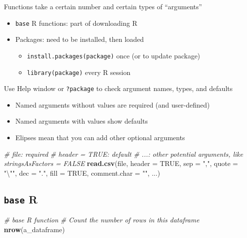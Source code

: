 \documentclass[
  openany]{book}
\newenvironment{Shaded}{\begin{snugshade}}{\end{snugshade}}
\newcommand{\CharTok}[1]{\textcolor[rgb]{0.31,0.60,0.02}{#1}}
\newcommand{\CommentTok}[1]{\textcolor[rgb]{0.56,0.35,0.01}{\textit{#1}}}
\newcommand{\DataTypeTok}[1]{\textcolor[rgb]{0.13,0.29,0.53}{#1}}
\newcommand{\KeywordTok}[1]{\textcolor[rgb]{0.13,0.29,0.53}{\textbf{#1}}}
\newcommand{\NormalTok}[1]{#1}
\newcommand{\OtherTok}[1]{\textcolor[rgb]{0.56,0.35,0.01}{#1}}
\newcommand{\StringTok}[1]{\textcolor[rgb]{0.31,0.60,0.02}{#1}}
\providecommand{\tightlist}{%
  \setlength{\itemsep}{0pt}\setlength{\parskip}{0pt}}
\begin{document}
Functions take a certain number and certain types of ``arguments''

\begin{itemize}
\tightlist
\item
  \texttt{base} R functions: part of downloading R
\item
  Packages: need to be installed, then loaded

  \begin{itemize}
  \tightlist
  \item
    \texttt{install.packages(package)} once (or to update package)
  \item
    \texttt{library(package)} every R session
  \end{itemize}
\end{itemize}

Use Help window or \texttt{?package} to check argument names, types, and defaults

\begin{itemize}
\tightlist
\item
  Named arguments without values are required (and user-defined)
\item
  Named arguments with values show defaults
\item
  Elipses mean that you can add other optional arguments
\end{itemize}

\begin{Shaded}
\begin{Highlighting}[]
\CommentTok{# file: required}
\CommentTok{# header = TRUE: default}
\CommentTok{# ...: other potential arguments, like stringsAsFactors = FALSE}
\KeywordTok{read.csv}\NormalTok{(file, }\DataTypeTok{header =} \OtherTok{TRUE}\NormalTok{, }\DataTypeTok{sep =} \StringTok{","}\NormalTok{, }\DataTypeTok{quote =} \StringTok{"}\CharTok{\textbackslash{}"}\StringTok{"}\NormalTok{,}
         \DataTypeTok{dec =} \StringTok{"."}\NormalTok{, }\DataTypeTok{fill =} \OtherTok{TRUE}\NormalTok{, }\DataTypeTok{comment.char =} \StringTok{""}\NormalTok{, ...)}
\end{Highlighting}
\end{Shaded}

\hypertarget{base-r}{%
\subsection{\texorpdfstring{\texttt{base} R}{base R}}\label{base-r}}

\begin{Shaded}
\begin{Highlighting}[]
\CommentTok{# base R function}
\CommentTok{# Count the number of rows in this dataframe}
\KeywordTok{nrow}\NormalTok{(a_dataframe)}
\end{Highlighting}
\end{Shaded}
\end{document}
